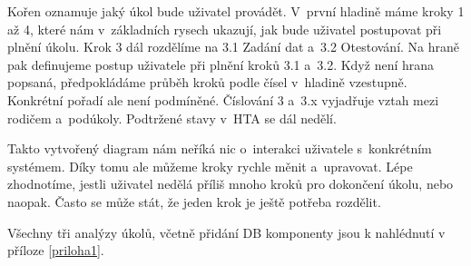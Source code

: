 Kořen oznamuje jaký úkol bude uživatel provádět. V~první hladině máme kroky 1 až 4, které nám v~základních rysech ukazují, jak bude uživatel postupovat při plnění úkolu. Krok 3 dál rozdělíme na 3.1 Zadání dat a~3.2 Otestování. Na hraně pak definujeme postup uživatele při plnění kroků 3.1 a~3.2. Když není hrana popsaná, předpokládáme průběh kroků podle čísel v~hladině vzestupně. Konkrétní pořadí ale není podmíněné. Číslování 3 a~3.x vyjadřuje vztah mezi rodičem a~podúkoly.  Podtržené stavy v~HTA se dál nedělí. 

Takto vytvořený diagram nám neříká nic o~interakci uživatele s~konkrétním systémem. Díky tomu ale můžeme kroky rychle měnit a~upravovat. Lépe zhodnotíme, jestli uživatel nedělá příliš mnoho kroků pro dokončení úkolu, nebo naopak. Často se může stát, že jeden krok je ještě potřeba rozdělit.

Všechny tři analýzy úkolů, včetně přidání DB komponenty jsou k nahlédnutí v příloze \ref{priloha1}.
